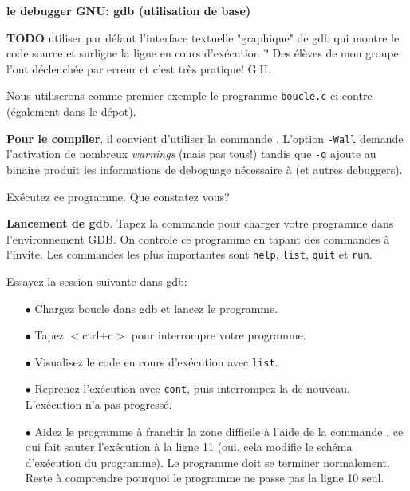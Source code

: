 \documentclass[10pt]{article}\usepackage[nu]{esial}
\begin{document}
\begin{Exercice}\textbf{le debugger GNU: gdb (utilisation de base)}

{\bf TODO} utiliser par défaut l'interface textuelle "graphique" de gdb qui montre le
code source et surligne la ligne en cours d'exécution ? Des élèves de mon groupe l'ont
déclenchée par erreur et c'est très pratique! G.H.


  \noindent\begin{minipage}[b]{.6\linewidth}
    Nous utiliserons comme premier exemple le programme \texttt{boucle.c}
    ci-contre (également dans le dépot).  \smallskip

    \textbf{Pour le compiler}, il convient d'utiliser la commande . L'option \texttt{-Wall} demande
    l'activation de nombreux \textit{warnings} (mais pas tous!) tandis que
    \texttt{-g} ajoute au binaire produit les informations de deboguage
    nécessaire à  (et autres debuggers).

    \Question Exécutez ce programme. Que constatez vous?
    \smallskip

    \textbf{Lancement de gdb}. Tapez la commande  pour
    charger votre programme dans l'environnement GDB.  On controle ce programme
    en tapant des commandes à l'invite. Les commandes les plus importantes sont
    \texttt{help}, \texttt{list}, \texttt{quit} et \texttt{run}.

    \Question Essayez la session suivante dans gdb:
    \begin{itemize}
    \item[$\bullet$] Chargez boucle dans gdb et lancez le programme. 
    \item[$\bullet$] Tapez $<$ctrl+c$>$ pour interrompre votre programme.
    \item[$\bullet$] Visualisez le code en cours d'exécution avec
      \texttt{list}.\vspace{.2\baselineskip}
    \end{itemize}

  \end{minipage}\hfill\begin{minipage}[b]{.38\linewidth}
  \end{minipage}

  \vspace{.2\baselineskip}\noindent
  \begin{minipage}{\linewidth}
  \begin{itemize}
  \item[$\bullet$] Reprenez l'exécution avec \texttt{cont}, puis interrompez-la
    de nouveau. L'exécution n'a pas progressé.
  \item[$\bullet$] Aidez le programme à franchir la zone difficile à l'aide de
    la commande , ce qui fait sauter l'exécution à la ligne 11
    (oui, cela modifie le schéma d'exécution du programme). Le programme doit
    se terminer normalement. Reste à comprendre pourquoi le programme ne passe
    pas la ligne 10 seul.
  \end{itemize}
  \end{minipage}


\end{Exercice}
\end{document}
